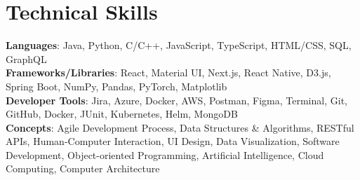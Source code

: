 \documentclass[letterpaper,10pt]{article}
\begin{document}
%
\section{Technical Skills}
\begin{itemize}[leftmargin=0.15in, label={}]
    \small{\item{
        \textbf{Languages}{: Java, Python, C/C++, JavaScript, TypeScript, HTML/CSS, SQL, GraphQL} \\
        \textbf{Frameworks/Libraries}{: React, Material UI, Next.js, React Native, D3.js, Spring Boot, NumPy, Pandas, PyTorch, Matplotlib} \\
        \textbf{Developer Tools}{: Jira, Azure, Docker, AWS, Postman, Figma, Terminal, Git, GitHub, Docker, JUnit, Kubernetes, Helm, MongoDB} \\
        \textbf{Concepts}{: Agile Development Process, Data Structures \& Algorithms, RESTful APIs, Human-Computer Interaction, UI Design, Data Visualization, Software Development, Object-oriented Programming, Artificial Intelligence, Cloud Computing, Computer Architecture} \\
        }}
\end{itemize}



\end{document}
